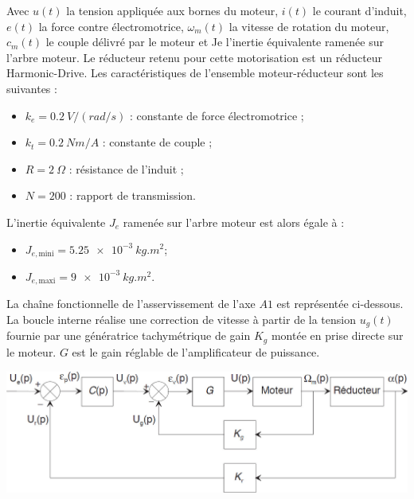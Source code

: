 \documentclass[10pt,fleqn]{article} %
\begin{document}
\begin{multicols}{2}
Avec  $u(t)$  la  tension  appliquée  aux  bornes  du moteur,  $i(t)$  le  courant  d’induit,  $e(t)$  la  force 
contre  électromotrice, $\omega_m(t)$  la  vitesse  de  rotation  du moteur,  $c_m(t)$  le  couple  délivré  par  le 
moteur et Je l’inertie équivalente ramenée sur l’arbre moteur. 
Le  réducteur  retenu  pour  cette  motorisation  est  un  réducteur  Harmonic-Drive.  Les 
caractéristiques de l’ensemble moteur-réducteur sont les suivantes : 
\begin{itemize}
\item $k_e = \SI{0,2}{V/(rad/s)}$ : constante de force électromotrice ; 
\item $k_t = \SI{0,2}{Nm/A}$ : constante de couple ; 
\item $R = \SI{2}{\Omega}$ : résistance de l’induit ; 
\item $N = 200$ : rapport de transmission.
\end{itemize} 

L’inertie équivalente $J_e$ ramenée sur l’arbre moteur est alors égale à : 
\begin{itemize}
\item $J_{e,\text{mini}} = \SI{5,25e-3}{kg.m^2}$;%
\item $J_{e,\text{maxi}} =\SI{9e-3}{kg.m^2}$.%
\end{itemize}

La chaîne fonctionnelle de l’asservissement de l’axe $A1$ est représentée ci-dessous. La boucle interne réalise une correction de vitesse à partir de la tension $u_g(t)$ fournie par une 
génératrice  tachymétrique  de  gain $K_g$ montée  en  prise  directe  sur  le moteur. $G$  est  le  gain 
réglable de l’amplificateur de puissance. 

\begin{center}
\includegraphics[width=\linewidth]{images/fig_02}
\end{center}


\end{multicols}
\end{document}
